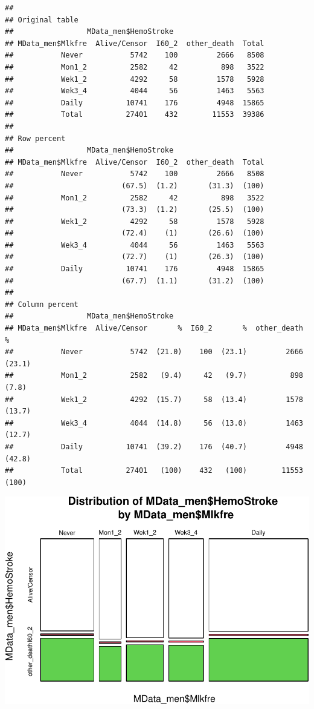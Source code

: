 \documentclass[
]{article}
\begin{document}
\begin{verbatim}
## 
## Original table 
##                 MData_men$HemoStroke
## MData_men$Mlkfre  Alive/Censor  I60_2  other_death  Total
##           Never           5742    100         2666   8508
##           Mon1_2          2582     42          898   3522
##           Wek1_2          4292     58         1578   5928
##           Wek3_4          4044     56         1463   5563
##           Daily          10741    176         4948  15865
##           Total          27401    432        11553  39386
## 
## Row percent 
##                 MData_men$HemoStroke
## MData_men$Mlkfre  Alive/Censor  I60_2  other_death  Total
##           Never           5742    100         2666   8508
##                         (67.5)  (1.2)       (31.3)  (100)
##           Mon1_2          2582     42          898   3522
##                         (73.3)  (1.2)       (25.5)  (100)
##           Wek1_2          4292     58         1578   5928
##                         (72.4)    (1)       (26.6)  (100)
##           Wek3_4          4044     56         1463   5563
##                         (72.7)    (1)       (26.3)  (100)
##           Daily          10741    176         4948  15865
##                         (67.7)  (1.1)       (31.2)  (100)
## 
## Column percent 
##                 MData_men$HemoStroke
## MData_men$Mlkfre  Alive/Censor       %  I60_2       %  other_death       %
##           Never           5742  (21.0)    100  (23.1)         2666  (23.1)
##           Mon1_2          2582   (9.4)     42   (9.7)          898   (7.8)
##           Wek1_2          4292  (15.7)     58  (13.4)         1578  (13.7)
##           Wek3_4          4044  (14.8)     56  (13.0)         1463  (12.7)
##           Daily          10741  (39.2)    176  (40.7)         4948  (42.8)
##           Total          27401   (100)    432   (100)        11553   (100)
\end{verbatim}

\includegraphics{traditionalPH_files/figure-latex/unnamed-chunk-22-1.pdf}
\end{document}
